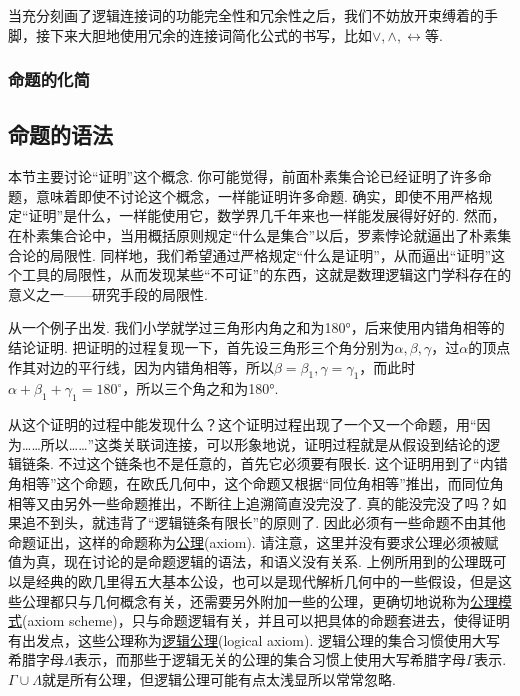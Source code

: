 \documentclass[main.tex]{subfiles}
\begin{document}
当充分刻画了逻辑连接词的功能完全性和冗余性之后，我们不妨放开束缚着的手脚，接下来大胆地使用冗余的连接词简化公式的书写，比如\(\vee, \wedge, \leftrightarrow\)等.

\subsubsection*{命题的化简}

\subsection{命题的语法}

本节主要讨论“证明”这个概念. 你可能觉得，前面朴素集合论已经证明了许多命题，意味着即使不讨论这个概念，一样能证明许多命题. 确实，即使不用严格规定“证明”是什么，一样能使用它，数学界几千年来也一样能发展得好好的. 然而，在朴素集合论中，当用概括原则规定“什么是集合”以后，罗素悖论就逼出了朴素集合论的局限性. 同样地，我们希望通过严格规定“什么是证明”，从而逼出“证明”这个工具的局限性，从而发现某些“不可证”的东西，这就是数理逻辑这门学科存在的意义之一——研究手段的局限性.

从一个例子出发. 我们小学就学过三角形内角之和为180°，后来使用内错角相等的结论证明. 把证明的过程复现一下，首先设三角形三个角分别为\(\alpha, \beta, \gamma\)，过\(\alpha\)的顶点作其对边的平行线，因为内错角相等，所以\(\beta = \beta_1, \gamma = \gamma_1\)，而此时\(\alpha + \beta_1 + \gamma_1 = 180^\circ\)，所以三个角之和为180°.

从这个证明的过程中能发现什么？这个证明过程出现了一个又一个命题，用“因为……所以……”这类关联词连接，可以形象地说，证明过程就是从假设到结论的逻辑链条. 不过这个链条也不是任意的，首先它必须要有限长. 这个证明用到了“内错角相等”这个命题，在欧氏几何中，这个命题又根据“同位角相等”推出，而同位角相等又由另外一些命题推出，不断往上追溯简直没完没了. 真的能没完没了吗？如果追不到头，就违背了“逻辑链条有限长”的原则了. 因此必须有一些命题不由其他命题证出，这样的命题称为\uline{公理}(axiom). 请注意，这里并没有要求公理必须被赋值为真，现在讨论的是命题逻辑的语法，和语义没有关系. 上例所用到的公理既可以是经典的欧几里得五大基本公设，也可以是现代解析几何中的一些假设，但是这些公理都只与几何概念有关，还需要另外附加一些的公理，更确切地说称为\uline{公理模式}(axiom scheme)，只与命题逻辑有关，并且可以把具体的命题套进去，使得证明有出发点，这些公理称为\uline{逻辑公理}(logical axiom). 逻辑公理的集合习惯使用大写希腊字母\(\Lambda\)表示，而那些于逻辑无关的公理的集合习惯上使用大写希腊字母\(\Gamma\)表示. \(\Gamma \cup \Lambda\)就是所有公理，{\small 但逻辑公理可能有点太浅显所以常常忽略.}
\end{document}
